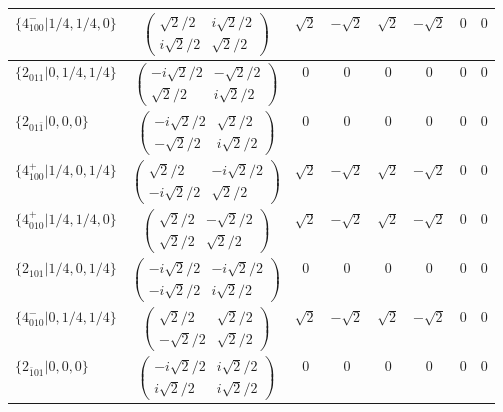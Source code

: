 \documentclass[3p,preprint]{elsarticle}
\begin{document}
\begin{table}[H]
{\begin{tabular}{|l|c||c|c|c|c|c|c|}
			$\{4^{-}_{100}|1/4,1/4,0\}$ &		$\left(\begin{array}{cc} \sqrt{2}/2&i\sqrt{2}/2 \\ i\sqrt{2}/2&\sqrt{2}/2 \end{array}\right)$	&$\sqrt{2}$ & $-\sqrt{2}$ & $\sqrt{2}$ & $-\sqrt{2}$ & $0$ & $0$ \\ \hline
			$\{2_{011}|0,1/4,1/4\}$ &		$\left(\begin{array}{cc} -i\sqrt{2}/2&-\sqrt{2}/2 \\ \sqrt{2}/2&i\sqrt{2}/2 \end{array}\right)$	&$0$ & $0$ & $0$ & $0$ & $0$ & $0$ \\ \hline
			$\{2_{01\bar{1}}|0,0,0\}$ &		$\left(\begin{array}{cc} -i\sqrt{2}/2&\sqrt{2}/2 \\ -\sqrt{2}/2&i\sqrt{2}/2 \end{array}\right)$	&$0$ & $0$ & $0$ & $0$ & $0$ & $0$ \\ \hline
			$\{4^{+}_{100}|1/4,0,1/4\}$ &		$\left(\begin{array}{cc} \sqrt{2}/2&-i\sqrt{2}/2 \\ -i\sqrt{2}/2&\sqrt{2}/2 \end{array}\right)$	&$\sqrt{2}$ & $-\sqrt{2}$ & $\sqrt{2}$ & $-\sqrt{2}$ & $0$ & 0 \\ \hline
			$\{4^{+}_{010}|1/4,1/4,0\}$ &		$\left(\begin{array}{cc} \sqrt{2}/2&-\sqrt{2}/2 \\ \sqrt{2}/2&\sqrt{2}/2 \end{array}\right)$	&$\sqrt{2}$ & $-\sqrt{2}$ & $\sqrt{2}$ & $-\sqrt{2}$ & $0$ & 0 \\ \hline
			$\{2_{101}|1/4,0,1/4\}$ &		$\left(\begin{array}{cc} -i\sqrt{2}/2&-i\sqrt{2}/2 \\ -i\sqrt{2}/2&i\sqrt{2}/2 \end{array}\right)$	&0 & $0$ & 0 & $0$ & 0 & 0 \\ \hline
			$\{4^{-}_{010}|0,1/4,1/4\}$ &		$\left(\begin{array}{cc} \sqrt{2}/2&\sqrt{2}/2 \\ -\sqrt{2}/2&\sqrt{2}/2 \end{array}\right)$	&$\sqrt{2}$ & $-\sqrt{2}$ & $\sqrt{2}$ & $-\sqrt{2}$ & $0$ & 0 \\ \hline
			$\{2_{\bar{1}01}|0,0,0\}$ &		$\left(\begin{array}{cc} -i\sqrt{2}/2&i\sqrt{2}/2 \\ i\sqrt{2}/2&i\sqrt{2}/2 \end{array}\right)$	&0 & $0$ & 0 & $0$ & 0 & 0 \\ \hline
		\end{tabular}
		}
\end{table}
			
\end{document}
